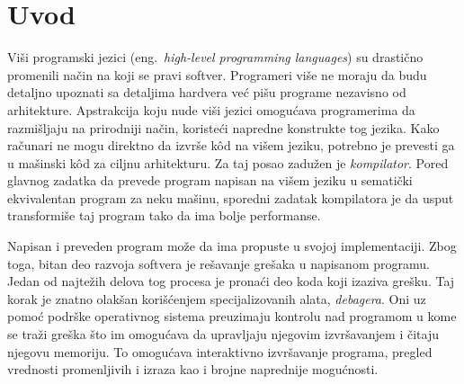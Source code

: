 \documentclass[12pt,oneside]{memoir}
\begin{document}
\frontmatter
\naslovna
\komisija
\posveta{}
\apstrakt
\tableofcontents*

\mainmatter

\chapter{Uvod}

Viši programski jezici (eng.~{\em high-level programming languages}) su drastično promenili način na koji se pravi softver.
Programeri više ne moraju da budu detaljno upoznati sa detaljima hardvera već pišu programe nezavisno od arhitekture.
Apstrakcija koju nude viši jezici omogućava programerima da razmišljaju na prirodniji način, koristeći napredne konstrukte tog jezika.
Kako računari ne mogu direktno da izvrše k\^od na višem jeziku, potrebno je prevesti ga u mašinski k\^od za ciljnu arhitekturu.
Za taj posao zadužen je \emph{kompilator}.
%
Pored glavnog zadatka da prevede program napisan na višem jeziku u sematički ekvivalentan program za neku mašinu, sporedni zadatak kompilatora je da usput transformiše taj program tako da ima bolje performanse.

Napisan i preveden program može da ima propuste u svojoj implementaciji. Zbog toga,
bitan deo razvoja softvera je rešavanje grešaka u napisanom programu.
Jedan od najtežih delova tog procesa je pronaći deo koda koji izaziva grešku.
Taj korak je znatno olakšan korišćenjem specijalizovanih alata, \emph{debagera}.
Oni uz pomoć podrške operativnog sistema preuzimaju kontrolu nad programom u kome se traži greška što im omogućava da upravljaju njegovim izvršavanjem i čitaju njegovu memoriju.
To omogućava interaktivno izvršavanje programa, pregled vrednosti promenljivih i izraza kao i brojne naprednije mogućnosti.
\end{document}
